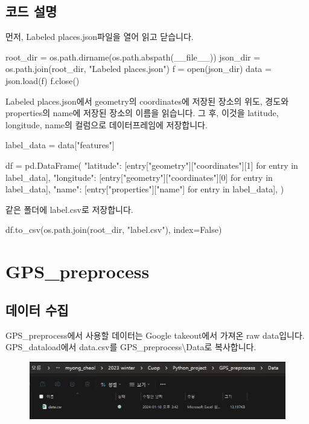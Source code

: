 \documentclass{oblivoir}
\begin{document}
  \section{코드 설명}
  먼저, Labeled places.json파일을 열어 읽고 닫습니다.
  \begin{python}[label={Label_dataload_1}]
    root_dir = os.path.dirname(os.path.abspath(__file__))
    json_dir = os.path.join(root_dir, "Labeled places.json")
    f = open(json_dir)
    data = json.load(f)
    f.close()
  \end{python}
  Labeled places.json에서 geometry의 coordinates에 저장된 장소의 위도, 경도와 properties의 name에 저장된 장소의 이름을 읽습니다.
  그 후, 이것을 latitude, longitude, name의 컬럼으로 데이터프레임에 저장합니다.
  \begin{python}[label={Label_dataload_2}]
    label_data = data["features"]

    df = pd.DataFrame(
        {
            "latitude": [entry["geometry"]["coordinates"][1] for entry in label_data],
            "longitude": [entry["geometry"]["coordinates"][0] for entry in label_data],
            "name": [entry["properties"]["name"] for entry in label_data],
        }
    )
      \end{python}
  같은 폴더에 label.csv로 저장합니다.
  \begin{python}[label={Label_dataload_3}]
    df.to_csv(os.path.join(root_dir, "label.csv"), index=False)
  \end{python}

  \chapter{GPS\_preprocess}
  \setcounter{section}{0}
  \section{데이터 수집}
  GPS\_preprocess에서 사용할 데이터는 Google takeout에서 가져온 raw data입니다.
  GPS\_dataload에서 data.csv를 GPS\_preprocess\textbackslash Data로 복사합니다.
  \begin{figure}[H]
    \includegraphics[width=\textwidth]{GPS_preprocess_1.png}
  \end{figure}
\end{document}
